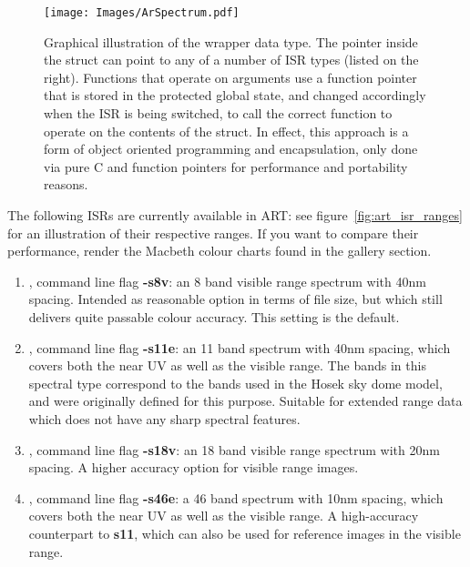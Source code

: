 \begin{figure}[htbp]
\begin{center}
\texttt{[image: Images/ArSpectrum.pdf]} 
\end{center}
\caption{
\label{fig:arcolour} 
Graphical illustration of the  wrapper data type. The  pointer inside the struct can point to any of a number of ISR types (listed on the right). Functions that operate on  arguments use a function pointer that is stored in the  protected global state, and changed accordingly when the ISR is being switched, to call the correct function to operate on the  contents of the struct. In effect, this approach is a form of object oriented programming and encapsulation, only done via pure C and function pointers for performance and portability reasons.
}
\end{figure}

The following ISRs are currently available in ART: see figure~\ref{fig:art_isr_ranges} for an illustration of their respective ranges. If you want to compare their performance, render the Macbeth colour charts found in the gallery section.

\begin{enumerate}
\item \textbf{}, command line flag \textbf{-s8v}: an 8 band visible range spectrum with 40nm spacing. Intended as reasonable option in terms of  file size, but which still delivers quite passable colour accuracy. This setting is the default.
\item \textbf{}, command line flag \textbf{-s11e}: an 11 band spectrum with 40nm spacing, which covers both the near UV as well as the visible range. The bands in this spectral type correspond to the bands used in the Hosek sky dome model, and were originally defined for this purpose. Suitable for extended range data which does not have any sharp spectral features.
\item \textbf{}, command line flag \textbf{-s18v}: an 18 band visible range spectrum with 20nm spacing. A higher accuracy option for visible range images.
\item \textbf{}, command line flag \textbf{-s46e}: a 46 band spectrum with 10nm spacing, which covers both the near UV as well as the visible range. A high-accuracy counterpart to \textbf{s11}, which can also be used for reference images in the visible range.
\end{enumerate}

